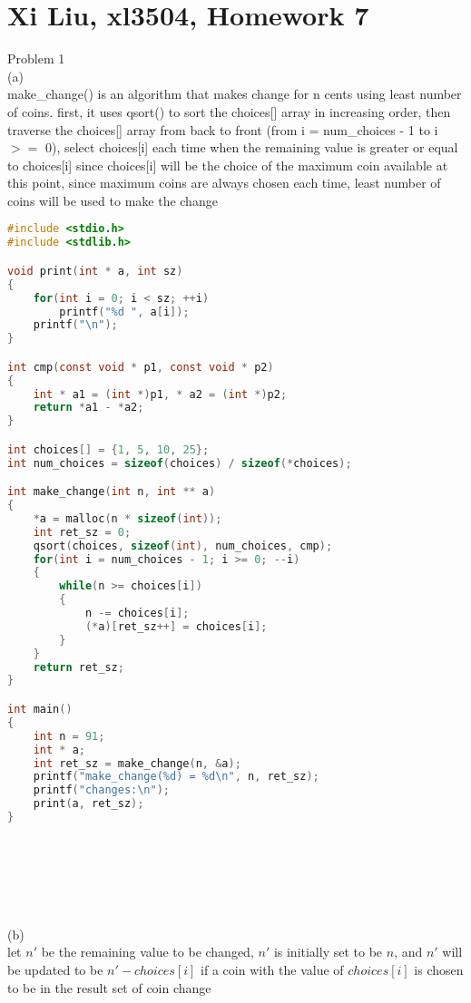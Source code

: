 \documentclass[12pt,border=4pt,multi]{article} %
\begin{document}
\section*{Xi Liu, xl3504, Homework 7}
Problem 1\\
(a)\\
make\_change() is an algorithm that makes change for n cents using least number of coins. first, it uses qsort() to sort the choices[] array in increasing order, then traverse the choices[] array from back to front (from i = num\_choices - 1 to i $>=$ 0), select choices[i] each time when the remaining value is greater or equal to choices[i] since choices[i] will be the choice of the maximum coin available at this point, since maximum coins are always chosen each time, least number of coins will be used to make the change\\
\begin{lstlisting}[language = c]
#include <stdio.h>
#include <stdlib.h>

void print(int * a, int sz)
{
    for(int i = 0; i < sz; ++i)
        printf("%d ", a[i]);
    printf("\n");
}

int cmp(const void * p1, const void * p2)
{
    int * a1 = (int *)p1, * a2 = (int *)p2;
    return *a1 - *a2;
}

int choices[] = {1, 5, 10, 25};
int num_choices = sizeof(choices) / sizeof(*choices);

int make_change(int n, int ** a)
{
    *a = malloc(n * sizeof(int));
    int ret_sz = 0;
    qsort(choices, sizeof(int), num_choices, cmp);
    for(int i = num_choices - 1; i >= 0; --i)
    {
        while(n >= choices[i])
        {
            n -= choices[i];
            (*a)[ret_sz++] = choices[i];
        }
    }
    return ret_sz;
}

int main()
{
    int n = 91;
    int * a;
    int ret_sz = make_change(n, &a);
    printf("make_change(%d) = %d\n", n, ret_sz);
    printf("changes:\n");
    print(a, ret_sz);
}
\end{lstlisting}
\leavevmode
\\
\\
\\
\\
\\
(b)\\
let $n'$ be the remaining value to be changed, $n'$ is initially set to be $n$, and $n'$ will be updated to be $n' - choices[i]$ if a coin with the value of $choices[i]$ is chosen to be in the result set of coin change\\
\end{document}
